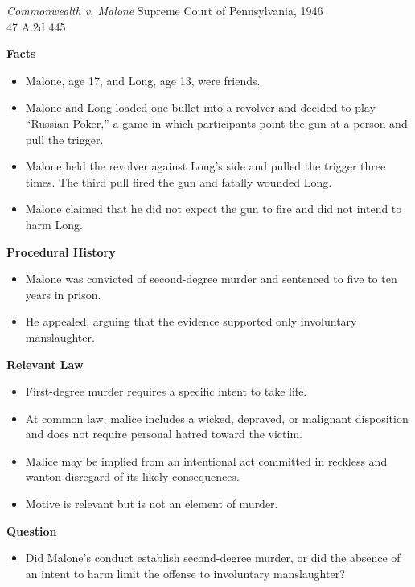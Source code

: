 \documentclass[11pt]{tex/lawoutline}
\begin{document}
\casebox
    {\textit{Commonwealth v. Malone}}
    {Supreme Court of Pennsylvania, 1946\\
    47 A.2d 445}
    {
        \textbf{Facts}
        \begin{itemize}
            \item Malone, age 17, and Long, age 13, were friends.
            \item Malone and Long loaded one bullet into a revolver and decided to play ``Russian Poker,'' a game in which participants point the gun at a person and pull the trigger.
            \item Malone held the revolver against Long's side and pulled the trigger three times. The third pull fired the gun and fatally wounded Long.
            \item Malone claimed that he did not expect the gun to fire and did not intend to harm Long.
        \end{itemize}

        \textbf{Procedural History}
        \begin{itemize}
            \item Malone was convicted of second-degree murder and sentenced to five to ten years in prison.
            \item He appealed, arguing that the evidence supported only involuntary manslaughter.
        \end{itemize}

        \textbf{Relevant Law}
        \begin{itemize}
            \item First-degree murder requires a specific intent to take life.
            \item At common law, malice includes a wicked, depraved, or malignant disposition and does not require personal hatred toward the victim.
            \item Malice may be implied from an intentional act committed in reckless and wanton disregard of its likely consequences.
            \item Motive is relevant but is not an element of murder.
        \end{itemize}

        \textbf{Question}
        \begin{itemize}
            \item Did Malone's conduct establish second-degree murder, or did the absence of an intent to harm limit the offense to involuntary manslaughter?
        \end{itemize}

}
\end{document}
